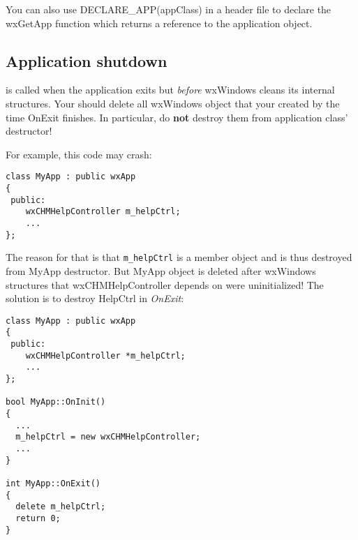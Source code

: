 You can also use DECLARE\_APP(appClass) in a header file to declare the wxGetApp function which returns
a reference to the application object.

\subsection{Application shutdown}

 is called when the application exits but {\it before}
wxWindows cleans its internal structures. Your should delete all wxWindows object that
your created by the time OnExit finishes. In particular, do {\bf not} destroy them
from application class' destructor!

For example, this code may crash:

\begin{verbatim}
class MyApp : public wxApp
{
 public:
    wxCHMHelpController m_helpCtrl;
    ...
};
\end{verbatim}

The reason for that is that {\tt m\_helpCtrl} is a member object and is 
thus destroyed from MyApp destructor. But MyApp object is deleted after 
wxWindows structures that wxCHMHelpController depends on were 
uninitialized! The solution is to destroy HelpCtrl in {\it OnExit}:

\begin{verbatim}
class MyApp : public wxApp
{
 public:
    wxCHMHelpController *m_helpCtrl;
    ...
};

bool MyApp::OnInit()
{
  ...
  m_helpCtrl = new wxCHMHelpController;
  ...
}

int MyApp::OnExit()
{
  delete m_helpCtrl;
  return 0;
}
\end{verbatim}
